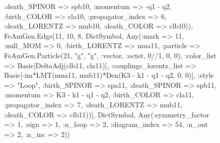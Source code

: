 \documentclass{revtex4}
\begin{document}
\begin{figure}[!htb]
\begin{center}
{:death_SPINOR => spb10, :momentum => -q1 - q2, :birth_COLOR => cla10, :propagator_index => 6, :death_LORENTZ => mub10, :death_COLOR => clb10)), FeAmGen.Edge(11, 10, 8, Dict{Symbol, Any}(:mark => 11, :null_MOM => 0, :birth_LORENTZ => mua11, :particle => FeAmGen.Particle(21, "g", "g", :vector, :octet, 0//1, 0, 0), :color_list => Basic[DeltaAdj(clb11, cla11)], :couplings_lorentz_list => Basic[-im*LMT(mua11, mub11)*Den(K3 - k1 - q1 - q2, 0, 0)], :style => "Loop", :birth_SPINOR => spa11, :death_SPINOR => spb11, :momentum => K3 - k1 - q1 - q2, :birth_COLOR => cla11, :propagator_index => 7, :death_LORENTZ => mub11, :death_COLOR => clb11))], Dict{Symbol, Any}(:symmetry_factor => 1, :sign => 1, :n_loop => 2, :diagram_index => 54, :n_out => 2, :n_inc => 2)) 
}
\end{center}
\end{figure}
\end{document}
